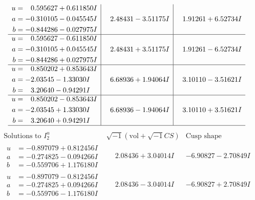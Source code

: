 \documentclass[1p]{elsarticle_modified}
\theoremstyle{definition}
\newcommand{\I}{\sqrt{-1}}
\begin{document}
$$\begin{array}{c|c|c}
\begin{aligned}
u &= \phantom{-}0.595627 + 0.611850 I \\
a &= -0.310105 - 0.045545 I \\
b &= -0.844286 - 0.027975 I\end{aligned}
 & \phantom{-}2.48431 - 3.51175 I & \phantom{-}1.91261 + 6.52734 I \\ \hline\begin{aligned}
u &= \phantom{-}0.595627 - 0.611850 I \\
a &= -0.310105 + 0.045545 I \\
b &= -0.844286 + 0.027975 I\end{aligned}
 & \phantom{-}2.48431 + 3.51175 I & \phantom{-}1.91261 - 6.52734 I \\ \hline\begin{aligned}
u &= \phantom{-}0.850202 + 0.853643 I \\
a &= -2.03545 - 1.33030 I \\
b &= \phantom{-}3.20640 - 0.94291 I\end{aligned}
 & \phantom{-}6.68936 + 1.94064 I & \phantom{-}3.10110 - 3.51621 I \\ \hline\begin{aligned}
u &= \phantom{-}0.850202 - 0.853643 I \\
a &= -2.03545 + 1.33030 I \\
b &= \phantom{-}3.20640 + 0.94291 I\end{aligned}
 & \phantom{-}6.68936 - 1.94064 I & \phantom{-}3.10110 + 3.51621 I\\
 \hline 
 \end{array}$$\newpage$$\begin{array}{c|c|c}  
\text{Solutions to }I^u_{2}& \I (\text{vol} + \sqrt{-1}CS) & \text{Cusp shape}\\
 \hline 
\begin{aligned}
u &= -0.897079 + 0.812456 I \\
a &= -0.274825 - 0.094266 I \\
b &= -0.559706 + 1.176180 I\end{aligned}
 & \phantom{-}2.08436 + 3.04014 I & -6.90827 - 2.70849 I \\ \hline\begin{aligned}
u &= -0.897079 - 0.812456 I \\
a &= -0.274825 + 0.094266 I \\
b &= -0.559706 - 1.176180 I\end{aligned}
 & \phantom{-}2.08436 - 3.04014 I & -6.90827 + 2.70849 I \\ \hline\begin{aligned}

\end{aligned}
\end{array}$$
\end{document}
